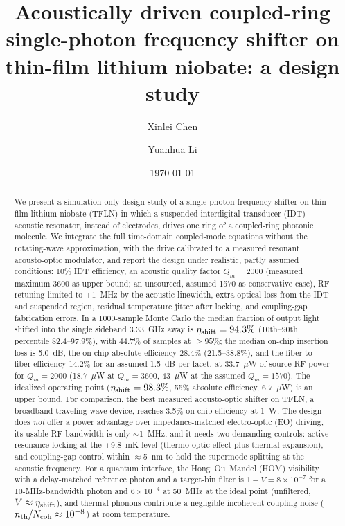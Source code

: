 \documentclass[aps,prapplied,reprint,superscriptaddress,amsmath,amssymb,floatfix]{revtex4-2}
\newcommand{\etash}{\eta_{\rm shift}}
\begin{document}
\title{Acoustically driven coupled-ring single-photon frequency shifter on thin-film lithium niobate: a design study}

\author{Xinlei Chen}
\author{Yuanhua Li}

\date{\today}

\begin{abstract}
We present a simulation-only design study of a single-photon frequency shifter on thin-film lithium niobate (TFLN) in which a suspended interdigital-transducer (IDT) acoustic resonator, instead of electrodes, drives one ring of a coupled-ring photonic molecule. We integrate the full time-domain coupled-mode equations without the rotating-wave approximation, with the drive calibrated to a measured resonant acousto-optic modulator, and report the design under realistic, partly assumed conditions: 10\% IDT efficiency, an acoustic quality factor $Q_m=2000$ (measured maximum 3600 as upper bound; an unsourced, assumed 1570 as conservative case), RF retuning limited to $\pm1$~MHz by the acoustic linewidth, extra optical loss from the IDT and suspended region, residual temperature jitter after locking, and coupling-gap fabrication errors. In a 1000-sample Monte Carlo the median fraction of output light shifted into the single sideband 3.33~GHz away is $\etash=94.3\%$ (10th--90th percentile 82.4--97.9\%), with 44.7\% of samples at $\ge95\%$; the median on-chip insertion loss is 5.0~dB, the on-chip absolute efficiency 28.4\% (21.5--38.8\%), and the fiber-to-fiber efficiency 14.2\% for an assumed 1.5~dB per facet, at 33.7~$\mu$W of source RF power for $Q_m=2000$ (18.7~$\mu$W at $Q_m=3600$, 43~$\mu$W at the assumed $Q_m=1570$). The idealized operating point ($\etash=98.3\%$, 55\% absolute efficiency, 6.7~$\mu$W) is an upper bound. For comparison, the best measured acousto-optic shifter on TFLN, a broadband traveling-wave device, reaches 3.5\% on-chip efficiency at 1~W. The design does \emph{not} offer a power advantage over impedance-matched electro-optic (EO) driving, its usable RF bandwidth is only $\sim$1~MHz, and it needs two demanding controls: active resonance locking at the $\pm9.8$~mK level (thermo-optic effect plus thermal expansion), and coupling-gap control within $\approx$5~nm to hold the supermode splitting at the acoustic frequency. For a quantum interface, the Hong--Ou--Mandel (HOM) visibility with a delay-matched reference photon and a target-bin filter is $1-V=8\times10^{-7}$ for a 10-MHz-bandwidth photon and $6\times10^{-4}$ at 50~MHz at the ideal point (unfiltered, $V\approx\etash$), and thermal phonons contribute a negligible incoherent coupling noise ($n_{\rm th}/N_{\rm coh}\approx10^{-8}$) at room temperature.
\end{abstract}
\end{document}
